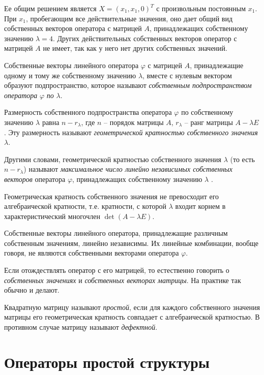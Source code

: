 \documentclass[%
	11pt,
	a4paper,
	utf8,
		]{article}
\begin{document}
Ее общим решением является $ X = (x_1, x_1, 0)^T $ с произвольным постоянным $ x_1 $. При $ x_1 $, пробегающим все действительные значения, оно дает общий вид собственных векторов оператора с матрицей $ A $, принадлежащих собственному значению $ \lambda = 4 $. Других действительных собственных векторов оператор с матрицей $ A $ не имеет, так как у него нет других собственных значений.

Собственные векторы линейного оператора $ \varphi $ с матрицей $ A $, принадлежащие одному и тому же собственному значению $ \lambda $, вместе с нулевым вектором образуют подпространство, которое называют \emph{собственным подпространством оператора} $ \varphi $ \emph{по} $ \lambda $.

Размерность собственного подпространства оператора $ \varphi $ по собственному значению $ \lambda $ равна $ n - r_\lambda $, где $ n $ -- порядок матрицы $ A $, $ r_\lambda $ -- ранг матрицы $ A - \lambda E $. Эту размерность называют \emph{геометрической кратностью собственного значения} $ \lambda $.

Другими словами, геометрической кратностью собственного значения $ \lambda $ (то есть $ n - r_\lambda $) называют \emph{максимальное число линейно независимых собственных векторов} оператора $ \varphi $, принадлежащих собственному значению $ \lambda $ \cite[]{shevtsov:linal-2012}.

Геометрическая кратность собственного значения не превосходит его алгебраической кратности, т.е. кратности, с которой $ \lambda $ входит корнем в характеристический многочлен $ \det (A - \lambda E) $.

Собственные векторы линейного оператора, принадлежащие различным собственным значениям, линейно независимы. Их линейные комбинации, вообще говоря, не являются собственными векторами оператора $ \varphi $.

Если отождествлять оператор с его матрицей, то естественно говорить о \emph{собственных значениях} и \emph{собственных векторах матрицы}. На практике так обычно и делают.

Квадратную матрицу называют \emph{простой}, если для каждого собственного значения матрицы его геометрическая кратность совпадает с алгебраической кратностью. В противном случае матрицу называют \emph{дефектной}.

\section{Операторы простой структуры}
\end{document}
